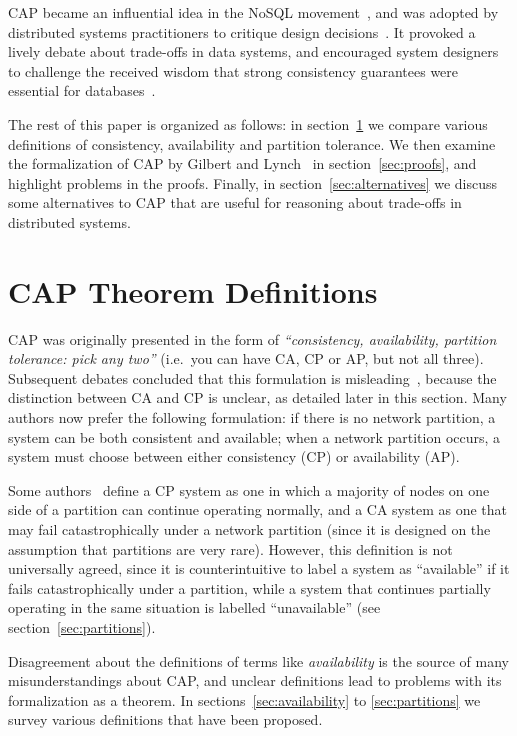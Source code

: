 \documentclass[a4paper,twocolumn,10pt]{article}
\begin{document}
CAP became an influential idea in the NoSQL movement~\cite{Vogels2008ey}, and was adopted by
distributed systems practitioners to critique design decisions~\cite{Hodges2013tj}. It provoked a
lively debate about trade-offs in data systems, and encouraged system designers to challenge the
received wisdom that strong consistency guarantees were essential for databases~\cite{Brewer2012ba}.

The rest of this paper is organized as follows: in section~\ref{sec:definitions} we compare various
definitions of consistency, availability and partition tolerance. We then examine the formalization
of CAP by Gilbert and Lynch~\cite{Gilbert2002il} in section~\ref{sec:proofs}, and highlight problems
in the proofs. Finally, in section~\ref{sec:alternatives} we discuss some alternatives to CAP that
are useful for reasoning about trade-offs in distributed systems.

\section{CAP Theorem Definitions}\label{sec:definitions}

CAP was originally presented in the form of \emph{``consistency, availability, partition tolerance:
pick any two''} (i.e.\ you can have CA, CP or AP, but not all three). Subsequent debates concluded
that this formulation is misleading~\cite{Brewer2012ba, Hale2010we, Robinson2010tp}, because the
distinction between CA and CP is unclear, as detailed later in this section. Many authors now prefer
the following formulation: if there is no network partition, a system can be both consistent and
available; when a network partition occurs, a system must choose between either consistency (CP) or
availability (AP).

Some authors~\cite{Darcy2010ta, Liochon2015vt} define a CP system as one in which a majority of
nodes on one side of a partition can continue operating normally, and a CA system as one that may
fail catastrophically under a network partition (since it is designed on the assumption that
partitions are very rare). However, this definition is not universally agreed, since it is
counterintuitive to label a system as ``available'' if it fails catastrophically under a partition,
while a system that continues partially operating in the same situation is labelled ``unavailable''
(see section~\ref{sec:partitions}).

Disagreement about the definitions of terms like \emph{availability} is the source of many
misunderstandings about CAP, and unclear definitions lead to problems with its formalization as a
theorem. In sections~\ref{sec:availability} to \ref{sec:partitions} we survey various definitions
that have been proposed.
\end{document}

